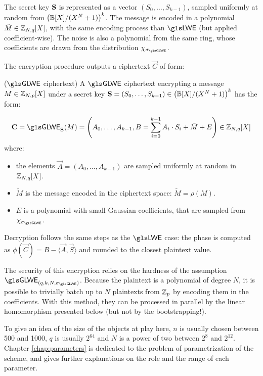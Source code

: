 The secret key $\mathbf S$ is represented as a vector $(S_0, \dots, S_{k-1})$, sampled uniformly at random from $\left (\mathbb{B}[X] / (X^N + 1) \right )^k$. 
%
The message is encoded in a polynomial $\tilde M \in \mathbb{Z}_{N,q}[X]$, with the same encoding process than $\LWE$ (but applied coefficient-wise). The noise is also a polynomial from the same ring, whose coefficients are drawn from the distribution $\chi_{\glweSigma}$.
%

The encryption procedure outputs a ciphertext $\vec C$ of form:


\begin{definition}($\GLWE$ ciphertext)
	A $\GLWE$ ciphertext encrypting a message $M \in \mathbb{Z}_{N,p}[X]$ under a secret key $\mathbf S = (S_0, \dots, S_{k-1}) \in \left (\mathbb{B}[X]/(X^N + 1) \right )^k$ has the form:
	
	\begin{equation*}
		\vec C = \GLWE_{\glweSecretKey}(M) = \left ( A_0, \dots, A_{k-1}, B = \sum_{i=0}^{k-1} A_i \cdot S_i + \tilde M + E \right ) \in \glweRing
	\end{equation*}
	where:
	\begin{itemize}
		\item the elements $\vec A = (A_0, \dots, A_{k-1})$ are sampled uniformly at random in $\mathbb{Z}_{N,q}[X]$.
		\item $\tilde M$ is the message encoded in the ciphertext space: $\tilde M = \rho(M)$.
		\item $E$ is a polynomial with small Gaussian coefficients, that are sampled from $\chi_{\glweSigma}$.
	\end{itemize}
\end{definition}



Decryption follows the same steps as the $\LWE$ case: the phase is computed as $\phi(\vec C) = B - \langle \vec A, \vec S \rangle$ and rounded to the closest plaintext value.


The security of this encryption relies on the hardness of the assumption $\GLWE_{(q, k, N, \glweSigma)}$. Because the plaintext is a polynomial of degree $N$, it is possible to trivially batch up to $N$ plaintexts from $\mathbb{Z}_p$ by encoding them in the coefficients. With this method, they can be processed in parallel by the linear homomorphism presented below (but not by the bootstrapping!).

To give an idea of the size of the objects at play here, $n$ is usually chosen between 500 and 1000, $q$ is usually $2^{64}$ and $N$ is a power of two between $2^8$ and $2^{12}$. Chapter \ref{chap:parameters} is dedicated to the problem of parametrization of the scheme, and gives further explanations on the role and the range of each parameter.

